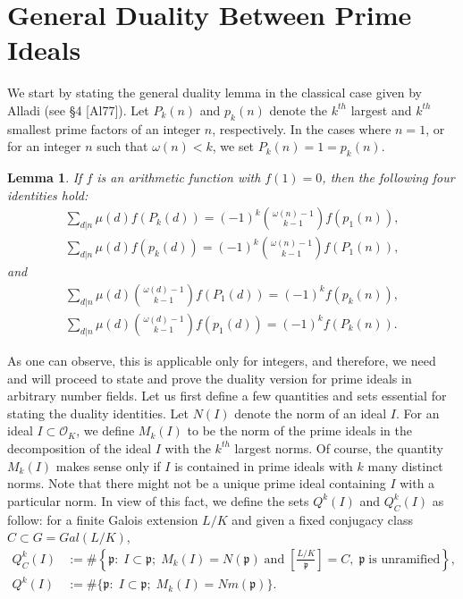 \documentclass[12pt]{article}
\numberwithin{equation}{section}
\newtheorem{lemma}[theorem]{Lemma}
\numberwithin{equation}{section}
\begin{document}
\section{General Duality Between Prime Ideals} 
We start by stating the general duality lemma in the classical case given by Alladi (see \S 4 [Al77]). Let $P_k(n)$ and $p_k(n)$ denote the $k^{th}$ largest and $k^{th}$ smallest prime factors of an integer $n$, respectively. In the cases where $n=1$, or for an integer $n$ such that $\omega(n)<k$, we set $P_k(n)=1=p_k(n)$.  
\begin{lemma}
    If $f$ is an arithmetic function with $f(1)=0$, then the following four identities hold:
    \begin{align}
        \sum_{d|n} \mu(d)f(P_k(d))=(-1)^k {\omega(n)-1 \choose k-1}f(p_1(n)), \nonumber\\
    \sum_{d|n} \mu(d)f(p_k(d))=(-1)^k {\omega(n)-1 \choose k-1}f(P_1(n)), \nonumber
    \end{align}
    and
    \begin{align}
         \sum_{d|n} \mu(d){\omega(d)-1 \choose k-1}f(P_1(d))=(-1)^k f(p_k(n)), \nonumber\\
    \sum_{d|n} \mu(d){\omega(d)-1 \choose k-1}f(p_1(d))=(-1)^k f(P_k(n)) .\nonumber
    \end{align}
\end{lemma}
\noindent As one can observe, this is applicable only for integers, and therefore, we need and will proceed to state and prove the duality version for prime ideals in arbitrary number fields. Let us first define a few quantities and sets essential for stating the duality identities. Let $N(I)$ denote the norm of an ideal $I$. For an ideal $I \subset \mathcal{O}_K$, we define $M_k(I)$ to be the norm of the prime ideals in the decomposition of the ideal $I$ with the $k^{th}$ largest norms. Of course, the quantity $M_k(I)$ makes sense only if $I$ is contained in prime ideals with $k$ many distinct norms. Note that there might not be a unique prime ideal containing $I$ with a particular norm.  In view of this fact, we define the sets $Q^k(I)$ and $Q_C^k(I)$ as follow: for a finite Galois extension $L/K$ and given a fixed conjugacy class $C \subset G = Gal(L/K)$, 
\begin{align}
     Q_C^k(I) &:= \# \left\{\mathfrak{p} :\; I\subset \mathfrak{p}; \;M_k(I)=N(\mathfrak{p})\;\text{and}\;\left[\frac{L/K}{\mathfrak{p}}\right]=C,\;\mathfrak{p}\;\text{is unramified}\right\}, \nonumber \\ 
     Q^k(I)&:=\# \{\mathfrak{p}:\;I \subset \mathfrak{p};\;M_k(I)=Nm(\mathfrak{p})\} . \nonumber
\end{align}
\end{document}

